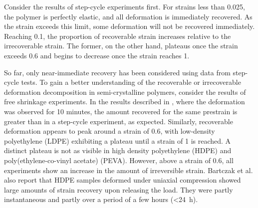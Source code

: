 Consider the results of step-cycle experiments first.
For strains less than 0.025, the polymer is perfectly elastic, and all deformation is immediately recovered.
As the strain exceeds this limit, some deformation will not be recovered immediately.
Reaching 0.1, the proportion of recoverable strain increases relative to the irrecoverable strain.
The former, on the other hand, plateaus once the strain exceeds 0.6 and begins to decrease once the strain reaches 1.

So far, only near-immediate recovery has been considered using data from step-cycle tests.
To gain a better understanding of the recoverable or irrecoverable deformation decomposition in semi-crystalline polymers, consider the results of free shrinkage experiments.
In the results described in \cite{hissNetworkStretchingSlip1999}, where the deformation was observed for 10 minutes, the amount recovered for the same prestrain is greater than in a step-cycle experiment, as expected.
Similarly, recoverable deformation appears to peak around a strain of 0.6, with low-density polyethylene (LDPE) exhibiting a plateau until a strain of 1 is reached.
A distinct plateau is not as visible in high density polyethylene (HDPE) and poly(ethylene-co-vinyl acetate) (PEVA).
However, above a strain of 0.6, all experiments show an increase in the amount of irreversible strain.
Bartczak et al. \citep{bartczakEvolutionCrystallineTexture1992} also report that HDPE samples deformed under uniaxial compression showed large amounts of strain recovery upon releasing the load.
They were partly instantaneous and partly over a period of a few hours (<\SI{24}{\hour}).

